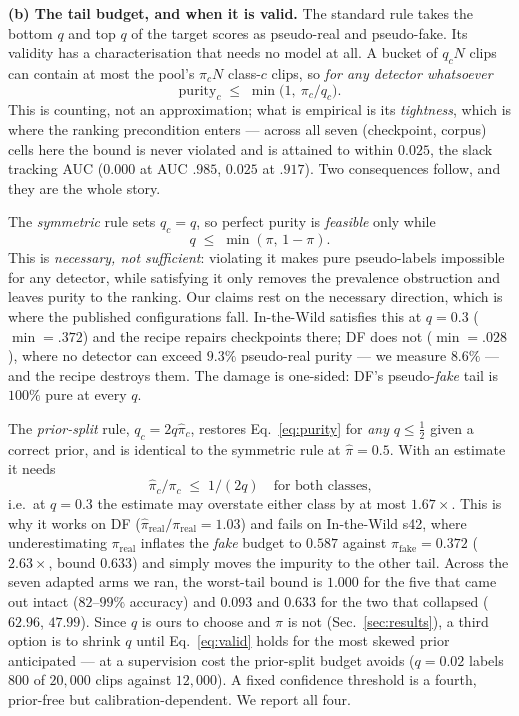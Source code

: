 \documentclass[conference]{IEEEtran}
\begin{document}
\textbf{(b) The tail budget, and when it is valid.} The standard rule takes the
bottom $q$ and top $q$ of the target scores as pseudo-real and pseudo-fake. Its
validity has a characterisation that needs no model at all. A bucket of $q_cN$
clips can contain at most the pool's $\pi_cN$ class-$c$ clips, so
\emph{for any detector whatsoever}
\begin{equation}
\mathrm{purity}_c\;\le\;\min\!\big(1,\ \pi_c/q_c\big).
\label{eq:purity}
\end{equation}
This is counting, not an approximation; what is empirical is its
\emph{tightness}, which is where the ranking precondition enters --- across all
seven (checkpoint, corpus) cells here the bound is never violated and is attained
to within $0.025$, the slack tracking AUC ($0.000$ at AUC $.985$, $0.025$ at
$.917$). Two consequences follow, and they are the whole story.

The \emph{symmetric} rule sets $q_c{=}q$, so perfect purity is \emph{feasible}
only while
\begin{equation}
q\;\le\;\min(\pi,\,1-\pi).
\label{eq:valid}
\end{equation}
This is \emph{necessary, not sufficient}: violating it makes pure pseudo-labels
impossible for any detector, while satisfying it only removes the prevalence
obstruction and leaves purity to the ranking. Our claims rest on the necessary
direction, which is where the published configurations fall.
In-the-Wild satisfies this at $q{=}0.3$ ($\min{=}.372$) and the recipe repairs
checkpoints there; DF does not ($\min{=}.028$), where no detector can exceed
$9.3\%$ pseudo-real purity --- we measure $8.6\%$ --- and the recipe destroys
them. The damage is one-sided: DF's pseudo-\emph{fake} tail is $100\%$ pure at
every $q$.

The \emph{prior-split} rule, $q_c{=}2q\hat\pi_c$, restores
Eq.~\eqref{eq:purity} for \emph{any} $q\le\tfrac12$ given a correct prior, and is
identical to the symmetric rule at $\hat\pi{=}0.5$. With an estimate it needs
\begin{equation}
\hat\pi_c/\pi_c\;\le\;1/(2q)\quad\text{for both classes,}
\label{eq:tol}
\end{equation}
i.e.\ at $q{=}0.3$ the estimate may overstate either class by at most $1.67\times$.
This is why it works on DF ($\hat\pi_{\mathrm{real}}/\pi_{\mathrm{real}}{=}1.03$)
and fails on In-the-Wild s42, where underestimating $\pi_{\mathrm{real}}$ inflates
the \emph{fake} budget to $0.587$ against $\pi_{\mathrm{fake}}{=}0.372$
($2.63\times$, bound $0.633$) and simply moves the impurity to the other tail.
Across the seven adapted arms we ran, the worst-tail bound is $1.000$ for the
five that came out intact ($82$--$99\%$ accuracy) and $0.093$ and $0.633$ for the
two that collapsed ($62.96$, $47.99$). Since $q$ is ours to choose and $\pi$ is
not (Sec.~\ref{sec:results}), a third option is to shrink $q$ until
Eq.~\eqref{eq:valid} holds for the most skewed prior anticipated --- at a
supervision cost the prior-split budget avoids ($q{=}0.02$ labels $800$ of
$20{,}000$ clips against $12{,}000$). A fixed confidence threshold is a fourth,
prior-free but calibration-dependent. We report all four.
\end{document}
